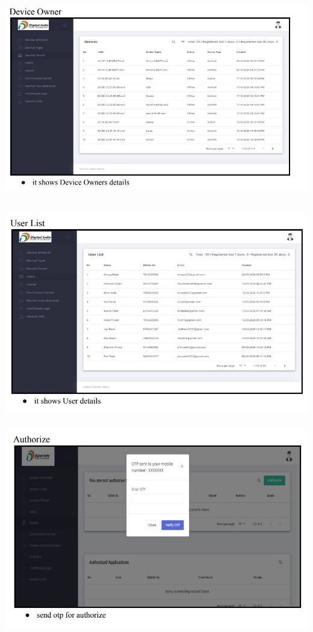 \begin{center}
\includegraphics[height=9cm,width=14cm]{Admin/Deviceowner.jpg}
\end{center}
\pagebreak

\begin{center}
\includegraphics[height=9cm,width=14cm]{Admin/Userlist.jpg}
\end{center}

\begin{center}
\includegraphics[height=9cm,width=14cm]{Admin/Authorize.jpg}
\end{center}
\pagebreak

